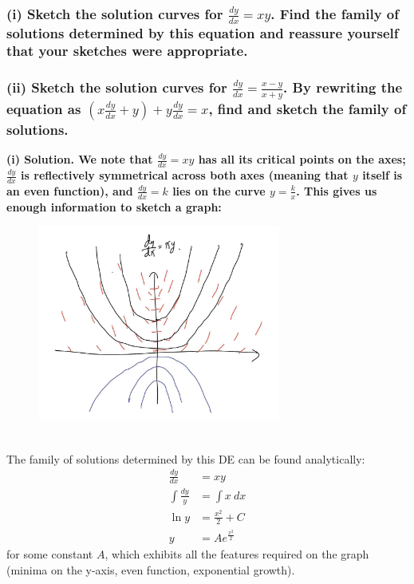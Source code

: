 \documentclass{article}
\begin{document}
\subsubsection*{(i) Sketch the solution curves for $\frac{dy}{dx}=xy$. Find the family of solutions determined by this equation and reassure yourself that your sketches were appropriate. 
\\ \\ (ii) Sketch the solution curves for $\frac{dy}{dx} = \frac{x-y}{x+y}$. By rewriting the equation as $(x\frac{dy}{dx}+y)+y\frac{dy}{dx}=x$, find and sketch the family of solutions.}
\bf (i) Solution. \normalfont We note that $\frac{dy}{dx} = xy$ has all its critical points on the axes; $\frac{dy}{dx}$ is reflectively symmetrical across both axes (meaning that $y$ itself is an even function), and $\frac{dy}{dx} = k$ lies on the curve $y = \frac{k}{x}$. This gives us enough information to sketch a graph:\\
\begin{figure}[h]
    \centering
    \includegraphics[width=8cm]{DE-ch2-9-1.jpg}
\end{figure}\\
The family of solutions determined by this DE can be found analytically:
\begin{equation*}
    \begin{aligned}
        \frac{dy}{dx} &= xy \\
        \int \frac{dy}{y} &= \int x\ dx \\
        \ln y &= \frac{x^2}{2} + C \\
        y &= Ae^{\frac{x^2}{2}}
    \end{aligned}
\end{equation*}
for some constant $A$, which exhibits all the features required on the graph (minima on the y-axis, even function, exponential growth).
\\
\\
\end{document}
